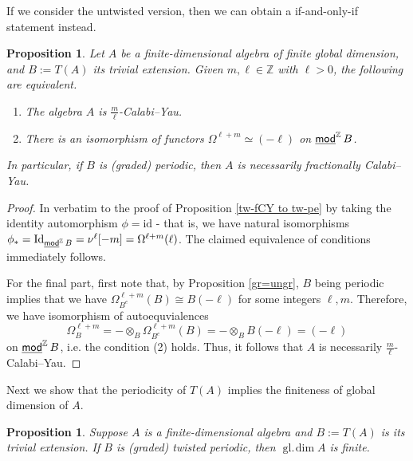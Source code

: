 \documentclass[a4paper,reqno,11pt]{amsart}
\newtheorem{proposition}[theorem]{Proposition}
\theoremstyle{definition}
\newcommand{\Z}{\mathbb{Z}}
\newcommand{\gl}{\operatorname{gl.\!dim}\nolimits}
\newcommand{\stmod}{\mathop{\underline{\mod}}\nolimits}
\newcommand{\new}[1]{{\blue #1}}
\numberwithin{equation}{section}
\begin{document}
If we consider the untwisted version, then we can obtain a if-and-only-if statement instead.
\begin{proposition}\label{periodic to fCY}
Let $A$ be a finite-dimensional algebra of finite global dimension, and $B:=T(A)$ its trivial extension. Given $m,\ell\in\Z$ with $\ell>0$, the following are equivalent.
\begin{enumerate}[(1)]
\item
  The algebra $A$ is $\frac{m}{\ell}$-Calabi--Yau.
\item
There is an isomorphism of functors $\Omega^{\ell+m}\simeq  (-\ell)$ on $\stmod^{\Z}B$.
\end{enumerate}
In particular, if $B$ is (graded) periodic, then $A$ is necessarily fractionally Calabi--Yau.
\end{proposition}

\begin{proof}
In verbatim to the proof of Proposition \ref{tw-fCY to tw-pe} by taking the identity automorphism $\phi=\mathrm{id}$ - that is, we have natural isomorphisms
$\phi_*=\mathrm{Id}_{\stmod^\Z B}=\nu^\ell[-m]= \Omega^{\ell+m}(\ell)$.  The claimed equivalence of conditions immediately follows.

For the final part, first note that, by Proposition \ref{gr=ungr}, $B$ being periodic implies that we have $\Omega_{B^e}^{\ell+m}(B)\cong B(-\ell)$ for some integers $\ell,m$.  Therefore, we have isomorphism of autoequvialences \[
\Omega_B^{\ell+m} = -\otimes_B\Omega_{B^e}^{\ell+m}(B) = -\otimes_BB(-\ell) = (-\ell)
\]
on $\stmod^\Z B$, i.e. the condition (2) holds.  Thus, it follows that $A$ is necessarily $\frac{m}{\ell}$-Calabi--Yau.
\end{proof}

\new{Next we show that the periodicity of $T(A)$ implies the finiteness of global dimension of $A$.} 

\begin{proposition}\label{fin gl}
Suppose $A$ is a finite-dimensional algebra and $B:=T(A)$ is its trivial extension.
If $B$ is (graded) twisted periodic, then $\gl A$ is finite.
\end{proposition}
\end{document}

